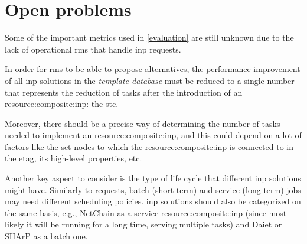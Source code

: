 \section{Open problems}
Some of the important metrics used in \autoref{evaluation} are still unknown due to the lack of operational \glspl{rm} that handle \gls{inp} requests.

In order for \glspl{rm} to be able to propose alternatives, the performance improvement of all \gls{inp} solutions in the \textit{template database} must be reduced to a single number that represents the reduction of  tasks after the introduction of an \gls{resource:composite:inp}: the \gls{stc}.

Moreover, there should be a precise way of determining the number of  tasks needed to implement an \gls{resource:composite:inp}, and this could depend on a lot of factors like the set nodes to which the \gls{resource:composite:inp} is connected to in the \gls{etag}, its high-level properties, etc.

Another key aspect to consider is the type of life cycle that different \gls{inp} solutions might have.
Similarly to  requests, batch (short-term) and service (long-term) jobs may need different scheduling policies.
\gls{inp} solutions should also be categorized on the same basis, e.g., NetChain \cite{netchain} as a service \gls{resource:composite:inp} (since most likely it will be running for a long time, serving multiple  tasks) and Daiet \cite{daiet} or SHArP \cite{sharp} as a batch one.
